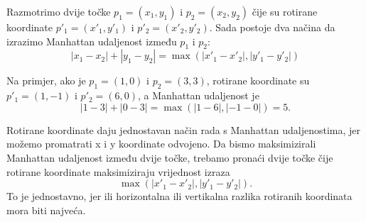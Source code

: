 Razmotrimo dvije točke $p_1=(x_1,y_1)$ i $p_2=(x_2,y_2)$ čije su
rotirane koordinate $p'_1=(x'_1,y'_1)$ i $p'_2=(x'_2,y'_2)$.
Sada postoje dva načina da izrazimo Manhattan udaljenost
između $p_1$ i $p_2$:
\[|x_1-x_2|+|y_1-y_2| = \max(|x'_1-x'_2|,|y'_1-y'_2|)\]

Na primjer, ako je $p_1=(1,0)$ i $p_2=(3,3)$,
rotirane koordinate su $p'_1=(1,-1)$ i $p'_2=(6,0)$,
a Manhattan udaljenost je
\[|1-3|+|0-3| = \max(|1-6|,|-1-0|) = 5.\]

Rotirane koordinate daju jednostavan način
rada s Manhattan udaljenostima, jer možemo
promatrati x i y koordinate odvojeno.
Da bismo maksimizirali Manhattan udaljenost između dvije točke,
trebamo pronaći dvije točke čije rotirane
koordinate maksimiziraju vrijednost izraza
\[\max(|x'_1-x'_2|,|y'_1-y'_2|).\]
To je jednostavno, jer ili horizontalna ili vertikalna
razlika rotiranih koordinata mora biti najveća.
